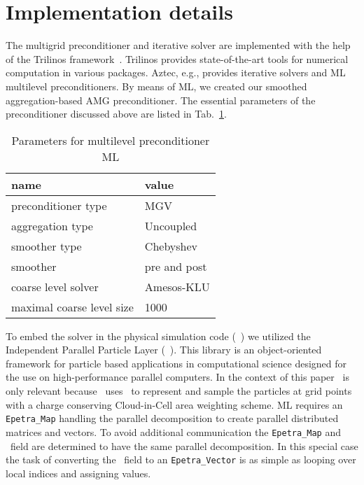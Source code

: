 \section{Implementation details}
\label{sec:impl}

The multigrid preconditioner and iterative solver are implemented with
the help of the Trilinos framework~\cite{Trilinos-Web-Site,
  Trilinos-TOMS}.  Trilinos provides state-of-the-art tools for
numerical computation in various packages.  Aztec, e.g., provides
iterative solvers and ML~\cite{gsht:06} multilevel preconditioners.  By
means of ML, we created our smoothed aggregation-based AMG
preconditioner.  The essential parameters of the preconditioner
discussed above are listed in Tab.~\ref{tab:sa_setup}.
\begin{table}[htb]
  \begin{center}
    \begin{tabular}{l|l}
      \hline
      name & value \\
      \hline
      preconditioner type & MGV \\
      aggregation type & Uncoupled \\
      smoother type & Chebyshev \\
      smoother & pre and post \\
      coarse level solver & Amesos-KLU \\
      maximal coarse level size & 1000 \\
      \hline
    \end{tabular}
    \caption{Parameters for multilevel
      preconditioner ML}
    \label{tab:sa_setup}
  \end{center}
\end{table}

To embed the solver in the physical simulation code (\opal~\cite{opal})
we utilized the Independent Parallel Particle Layer (\ippl~\cite{ippl}).
This library is an object-oriented framework for particle based
applications in computational science designed for the use on
high-performance parallel computers.  In the context of this paper
\ippl\ is only relevant because \opal\ uses \ippl\ to represent and
sample the particles at grid points with a charge conserving
Cloud-in-Cell area weighting scheme.  ML requires an
\texttt{Epetra\_Map} handling the parallel decomposition to create
parallel distributed matrices and vectors. To avoid additional
communication the \texttt{Epetra\_Map} and \ippl\ field are determined
to have the same parallel decomposition. In this special case the task
of converting the \ippl\ field to an \texttt{Epetra\_Vector} is as
simple as looping over local indices and assigning values.  

